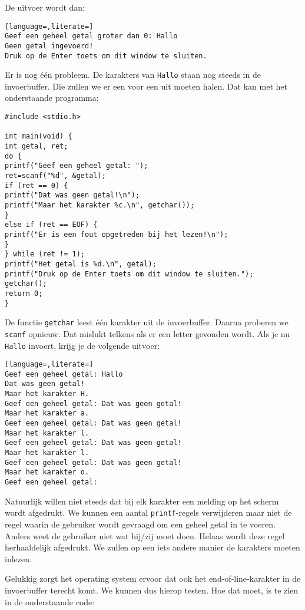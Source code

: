 De uitvoer wordt dan:

\begin{lstlisting}[language=,literate=]
Geef een geheel getal groter dan 0: Hallo
Geen getal ingevoerd!
Druk op de Enter toets om dit window te sluiten.
\end{lstlisting}

Er is nog \'e\'en probleem. De karakters van \lstinline|Hallo| staan nog steeds in de invoerbuffer. Die zullen we er een voor een uit moeten halen. Dat kan met het onderstaande programma:

\begin{lstlisting}
#include <stdio.h>

int main(void) {
int getal, ret;
do {
printf("Geef een geheel getal: ");
ret=scanf("%d", &getal);
if (ret == 0) {
printf("Dat was geen getal!\n");
printf("Maar het karakter %c.\n", getchar());
}
else if (ret == EOF) {
printf("Er is een fout opgetreden bij het lezen!\n");
}
} while (ret != 1);
printf("Het getal is %d.\n", getal);
printf("Druk op de Enter toets om dit window te sluiten.");
getchar();
return 0;
}

\end{lstlisting}

De functie \lstinline|getchar| leest \'e\'en karakter uit de invoerbuffer. Daarna proberen we \lstinline|scanf| opnieuw. Dat mislukt telkens als er een letter gevonden wordt. Als je nu \lstinline|Hallo| invoert, krijg je de volgende uitvoer:

\begin{lstlisting}[language=,literate=]
Geef een geheel getal: Hallo
Dat was geen getal!
Maar het karakter H.
Geef een geheel getal: Dat was geen getal!
Maar het karakter a.
Geef een geheel getal: Dat was geen getal!
Maar het karakter l.
Geef een geheel getal: Dat was geen getal!
Maar het karakter l.
Geef een geheel getal: Dat was geen getal!
Maar het karakter o.
Geef een geheel getal:
\end{lstlisting}

Natuurlijk willen niet steeds dat bij elk karakter een melding op het scherm wordt afgedrukt. We kunnen een aantal \lstinline|printf|-regels verwijderen maar niet de regel waarin de gebruiker wordt gevraagd om een geheel getal in te voeren. Anders weet de gebruiker niet wat hij/zij moet doen. Helaas wordt deze regel herhaaldelijk afgedrukt. We zullen op een iets andere manier de karakters moeten inlezen.

Gelukkig zorgt het operating system ervoor dat ook het end-of-line-karakter in de invoerbuffer terecht komt. We kunnen dus hierop testen. Hoe dat moet, is te zien in de onderstaande code:

